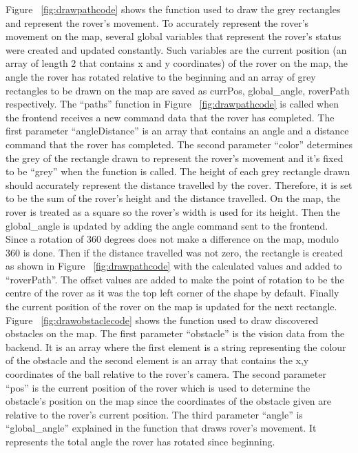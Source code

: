 \documentclass[a4paper]{article}
\begin{document}
Figure ~\ref{fig:drawpathcode} shows the function used to draw the grey rectangles and represent the 
rover’s movement. To accurately represent the rover’s movement on the map, several global variables that represent the 
rover’s status were created and updated constantly. Such variables are the current position (an array of length 2 that 
contains x and y coordinates) of the rover on the map, the angle the rover has rotated relative to the beginning and an 
array of grey rectangles to be drawn on the map are saved as currPos, global\_angle, roverPath respectively. The ``paths'' 
function in Figure ~\ref{fig:drawpathcode} is called when the frontend receives a new command data that the rover has completed. The first 
parameter “angleDistance” is an array that contains an angle and a distance command that the rover has completed. The 
second parameter “color” determines the grey of the rectangle drawn to represent the rover’s movement and it’s fixed to 
be “grey” when the function is called. The height of each grey rectangle drawn should accurately represent the distance 
travelled by the rover. Therefore, it is set to be the sum of the rover’s height and the distance travelled. On the map, 
the rover is treated as a square so the rover’s width is used for its height. Then the global\_angle is updated by adding 
the angle command sent to the frontend. Since a rotation of 360 degrees does not make a difference on the map, modulo 360 
is done. Then if the distance travelled was not zero, the rectangle is created as shown in Figure ~\ref{fig:drawpathcode} with the calculated 
values and added to ``roverPath''. The offset values are added to make the point of rotation to be the centre of the rover 
as it was the top left corner of the shape by default. Finally the current position of the rover on the map is updated for 
the next rectangle. Figure ~\ref{fig:drawobstaclecode} shows the function used to draw discovered obstacles on the map. The first parameter “obstacle” 
is the vision data from the backend. It is an array where the first element is a string representing the colour of the obstacle 
and the second element is an array that contains the x,y coordinates of the ball relative to the rover’s camera. The second 
parameter ``pos'' is the current position of the rover which is used to determine the obstacle’s position on the map since the 
coordinates of the obstacle given are relative to the rover’s current position. The third parameter ``angle'' is ``global\_angle'' 
explained in the function that draws rover’s movement. It represents the total angle the rover has rotated since beginning. 
\end{document}
